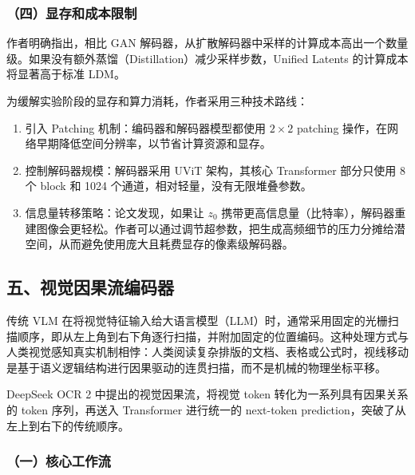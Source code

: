 \hypertarget{ux56dbux663eux5b58ux548cux6210ux672cux9650ux5236}{%
\subsubsection{（四）显存和成本限制}\label{ux56dbux663eux5b58ux548cux6210ux672cux9650ux5236}}

作者明确指出，相比 GAN 解码器，从扩散解码器中采样的计算成本高出一个数量级。如果没有额外蒸馏（Distillation）减少采样步数，Unified Latents 的计算成本将显著高于标准 LDM。

为缓解实验阶段的显存和算力消耗，作者采用三种技术路线：

\begin{enumerate}
\def\labelenumi{\arabic{enumi}.}
\tightlist
\item
  引入 Patching 机制：编码器和解码器模型都使用 \(2\times2\) patching 操作，在网络早期降低空间分辨率，以节省计算资源和显存。
\item
  控制解码器规模：解码器采用 UViT 架构，其核心 Transformer 部分只使用 8 个 block 和 1024 个通道，相对轻量，没有无限堆叠参数。
\item
  信息量转移策略：论文发现，如果让 \(z_0\) 携带更高信息量（比特率），解码器重建图像会更轻松。作者可以通过调节超参数，把生成高频细节的压力分摊给潜空间，从而避免使用庞大且耗费显存的像素级解码器。
\end{enumerate}

\hypertarget{ux4e94ux89c6ux89c9ux56e0ux679cux6d41ux7f16ux7801ux5668}{%
\subsection{五、视觉因果流编码器}\label{ux4e94ux89c6ux89c9ux56e0ux679cux6d41ux7f16ux7801ux5668}}

传统 VLM 在将视觉特征输入给大语言模型（LLM）时，通常采用固定的光栅扫描顺序，即从左上角到右下角逐行扫描，并附加固定的位置编码。这种处理方式与人类视觉感知真实机制相悖：人类阅读复杂排版的文档、表格或公式时，视线移动是基于语义逻辑结构进行因果驱动的连贯扫描，而不是机械的物理坐标平移。

DeepSeek OCR 2 中提出的视觉因果流，将视觉 token 转化为一系列具有因果关系的 token 序列，再送入 Transformer 进行统一的 next-token prediction，突破了从左上到右下的传统顺序。

\hypertarget{ux4e00ux6838ux5fc3ux5de5ux4f5cux6d41}{%
\subsubsection{（一）核心工作流}\label{ux4e00ux6838ux5fc3ux5de5ux4f5cux6d41}}

